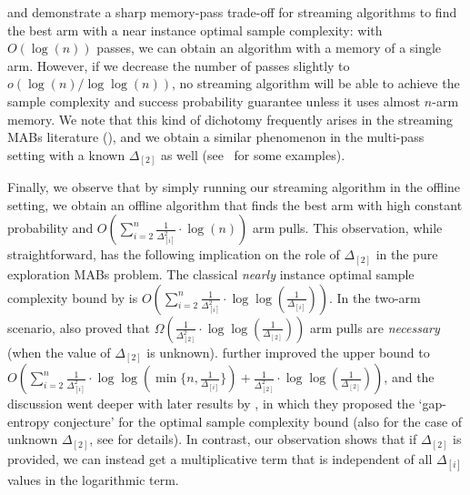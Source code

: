  and  demonstrate a sharp memory-pass trade-off for streaming algorithms to find the best arm with a near instance optimal sample complexity: with $O(\log(n))$ passes, we can obtain an algorithm with a memory of a single arm. However, if we decrease the number of passes slightly to $o(\log(n)/\log\log(n))$, no streaming algorithm will be able to achieve the sample complexity and success probability guarantee unless it uses almost $n$-arm memory. We note that this kind of dichotomy frequently arises in the streaming MABs literature (\cite{AssadiW20,AWneurips22,AgarwalKP22,AW23BestArm}), and we obtain a similar phenomenon in the multi-pass setting with a known $\Delta_{[2]}$ as well (see~ for some examples).

Finally, we observe that by simply running our streaming algorithm in the offline setting, we obtain an offline algorithm that finds the best arm with high constant probability and $O(\sum_{i=2}^{n}\frac{1}{\Delta^2_{[i]}}\cdot \log(n))$ arm pulls. This observation, while straightforward, has the following implication on the role of $\Delta_{[2]}$ in the pure exploration MABs problem. The classical \emph{nearly} instance optimal sample complexity bound by \cite{KarninKS13,JamiesonMNB14} is $O(\sum_{i=2}^{n}\frac{1}{\Delta^2_{[i]}}\cdot \log\log(\frac{1}{\Delta_{[i]}}))$. In the two-arm scenario, \cite{JamiesonMNB14} also proved that $\Omega(\frac{1}{\Delta^2_{[2]}}\cdot \log\log(\frac{1}{\Delta_{[2]}}))$ arm pulls are \emph{necessary} (when the value of $\Delta_{[2]}$ is unknown). \cite{ChenLi15} further improved the upper bound to $O(\sum_{i=2}^{n}\frac{1}{\Delta^2_{[i]}}\cdot \log\log(\min\{n, \frac{1}{\Delta_{[i]}}\}) + \frac{1}{\Delta^2_{[2]}}\cdot \log\log(\frac{1}{\Delta_{[2]}}))$, and the discussion went deeper with later results by \cite{ChenL16,CLQ17}, in which they proposed the `gap-entropy conjecture' for the optimal sample complexity bound (also for the case of unknown $\Delta_{[2]}$, see \cite{ChenL16} for details). In contrast, our observation shows that if $\Delta_{[2]}$ is provided, we can instead get a multiplicative term that is independent of all $\Delta_{[i]}$ values in the logarithmic term. %
